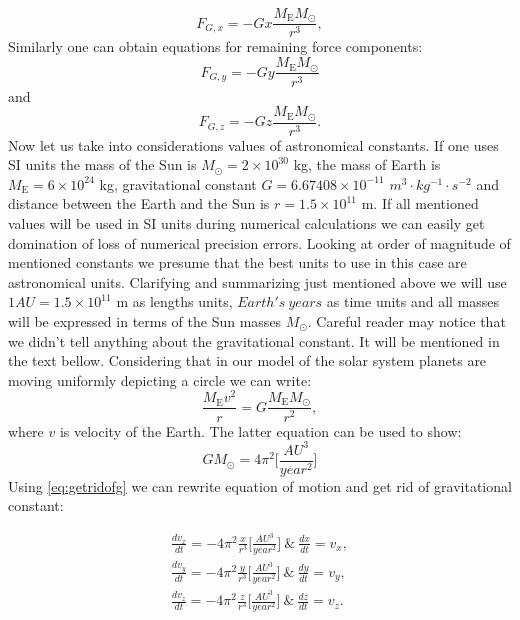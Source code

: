\documentclass[10pt]{article}
\begin{document}
\begin{equation}\label{eq:force_motion}
F_{G,x}=-Gx\frac{M_{\mathrm{E}}M_{\odot}}{r^3},
\end{equation}
Similarly one can obtain equations for remaining force components:
\[
{F_{G,y}}=-Gy\frac{M_{\mathrm{E}}M_{\odot}}{r^3}
\]
and
\[
{F_{G,z}}=-Gz\frac{M_{\mathrm{E}}M_{\odot}}{r^3}.
\]
Now let us take into considerations values of astronomical constants. If one uses SI units the mass of the Sun is $M_{\odot}=2\times 10^{30}$ kg, the mass of Earth is $M_{\mathrm{E}}=6\times 10^{24}$ kg, gravitational constant $G=6.67408 \times 10^{-11}$ $m^3 \cdot kg^{-1} \cdot s^{-2}$ and distance between the Earth and the Sun is $r=1.5 \times 10^{11}$ m. If all mentioned values will be used in SI units during numerical calculations we can easily get domination of loss of numerical precision errors. Looking at order of magnitude of mentioned constants we presume that the best units to use in this case are astronomical units. Clarifying and summarizing just mentioned
above we will use $1AU=1.5 \times 10^{11}$ m as lengths units, $Earth's\ years$ as time units and all masses will be expressed in terms of the Sun masses $M_{\odot}$. Careful reader may notice that we didn't tell anything about the gravitational constant. It will be mentioned in the text bellow.
Considering that in our model of the solar system planets are moving uniformly depicting a circle we can write:
\[
\frac{M_{\mathrm{E}}v^2}{r}=G\frac{M_{\mathrm{E}}M_{\odot}}{r^2},
\]
where $v$ is velocity of the Earth.
The latter equation can be used to show:
\begin{equation}\label{eq:getridofg}
GM_{\odot} = 4\pi^2 \Bigg[ \frac{AU^3}{year^2}\Bigg]
\end{equation}
Using \ref{eq:getridofg} we can rewrite equation of motion and get rid of gravitational constant:

\begin{equation}\label{eq:motion}
\begin{aligned}
\frac{dv_x}{dt}=-4\pi^2\frac{x}{r^3} \Bigg[ \frac{AU^3}{year^2}\Bigg]\ \& \ \frac{dx}{dt} = v_x,\\
\frac{dv_y}{dt}=-4\pi^2\frac{y}{r^3} \Bigg[ \frac{AU^3}{year^2}\Bigg]\ \& \ \frac{dy}{dt} = v_y, \\
\frac{dv_z}{dt}=-4\pi^2\frac{z}{r^3} \Bigg[ \frac{AU^3}{year^2}\Bigg]\ \& \ \frac{dz}{dt} = v_z.
\end{aligned}
\end{equation}
\end{document}
